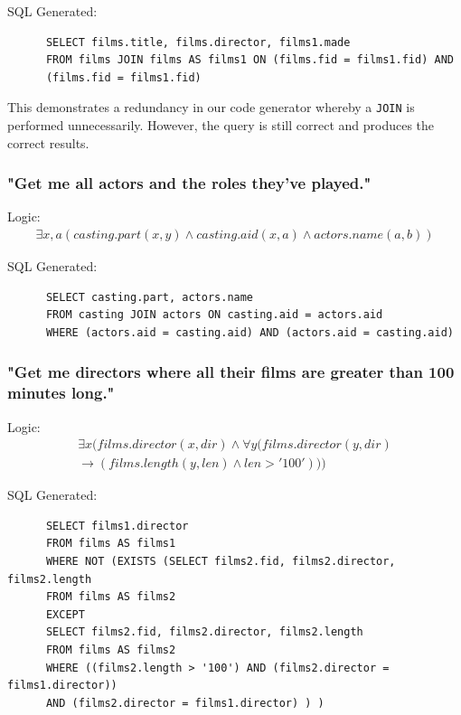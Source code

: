 \documentclass[a4paper, 11pt]{article}
\begin{document}
      SQL Generated:
      \begin{verbatim}
      SELECT films.title, films.director, films1.made
      FROM films JOIN films AS films1 ON (films.fid = films1.fid) AND
      (films.fid = films1.fid)
      \end{verbatim}

      This demonstrates a redundancy in our code generator whereby a
      \texttt{JOIN} is performed unnecessarily. However, the query is still
      correct and produces the correct results.

    \subsubsection*{"Get me all actors and the roles they've played."}

      Logic:
      \begin{gather}
        \exists x,a(casting.part(x, y) \land casting.aid(x, a) \land actors.name(a, b))
      \end{gather}

      SQL Generated:
      \begin{verbatim}
      SELECT casting.part, actors.name
      FROM casting JOIN actors ON casting.aid = actors.aid
      WHERE (actors.aid = casting.aid) AND (actors.aid = casting.aid)
      \end{verbatim}

    \subsubsection*{"Get me directors where all their films are greater than 100
      minutes long."}

      Logic:
      \begin{multline}
        \exists x(films.director(x, dir) \land \forall y(films.director(y, dir)
        \\
        \to (films.length(y, len) \land len > '100')))
      \end{multline}

      SQL Generated:
      \begin{verbatim}
      SELECT films1.director
      FROM films AS films1
      WHERE NOT (EXISTS (SELECT films2.fid, films2.director, films2.length
      FROM films AS films2
      EXCEPT
      SELECT films2.fid, films2.director, films2.length
      FROM films AS films2
      WHERE ((films2.length > '100') AND (films2.director = films1.director))
      AND (films2.director = films1.director) ) )
      \end{verbatim}
\end{document}
